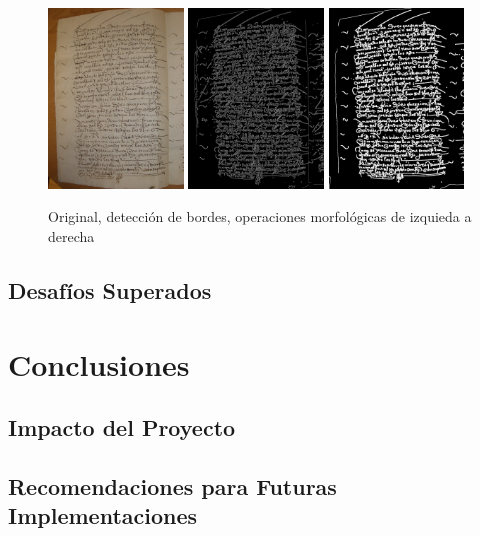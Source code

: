 \documentclass[11pt,a4paper]{article}
\begin{document}
\begin{figure}[h] \centering \begin{minipage}{1.0\textwidth} \includegraphics[width=0.32\textwidth]{CODEA-0205_2v.jpg} \includegraphics[width=0.32\textwidth]{canny_image_aftergauss_eq2.png} \includegraphics[width=0.32\textwidth]{photo_2025-01-27_21-34-01.jpg} \caption{Original, detecci\'on de bordes, operaciones morfol\'ogicas de izquieda a derecha} \label{fig:tresfotos} \end{minipage} \end{figure}

\subsection{Desafíos Superados}

\section{Conclusiones} \subsection{Impacto del Proyecto} \subsection{Recomendaciones para Futuras Implementaciones}
\end{document}

